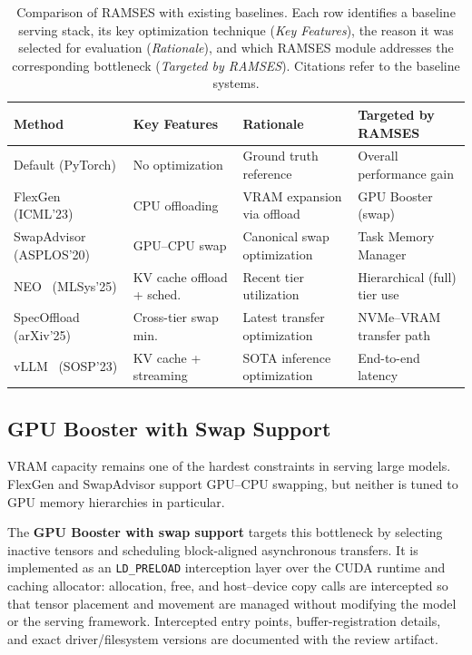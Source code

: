 \begin{table}[t]
\centering
\renewcommand{\arraystretch}{1.0}
\caption{Comparison of RAMSES with existing baselines. Each row identifies a baseline serving stack, its key optimization technique (\emph{Key Features}), the reason it was selected for evaluation (\emph{Rationale}), and which RAMSES module addresses the corresponding bottleneck (\emph{Targeted by RAMSES}). Citations refer to the baseline systems.}
\label{tab:baseline_comparison}
\begin{tabular}{|p{3.8cm}|p{3cm}|p{3.5cm}|p{3.5cm}|}
\hline
\textbf{Method} & \textbf{Key Features} & \textbf{Rationale} & \textbf{Targeted by RAMSES} \\
\hline
Default (PyTorch) & No optimization & Ground truth reference & Overall performance gain \\
\hline
FlexGen~\cite{sheng2023flexgen} (ICML'23) & CPU offloading & VRAM expansion via offload & GPU Booster (swap) \\
\hline
SwapAdvisor~\cite{swapAdvisor2020} (ASPLOS'20) & GPU--CPU swap & Canonical swap optimization & Task Memory Manager \\
\hline
NEO~\cite{jiang2024neo} (MLSys'25) & KV cache offload + sched. & Recent tier utilization & Hierarchical (full) tier use \\
\hline
SpecOffload~\cite{zhuge2025specoffload} (arXiv'25) & Cross-tier swap min. & Latest transfer optimization & NVMe--VRAM transfer path \\
\hline
vLLM~\cite{kwon2023pagedattention} (SOSP'23) & KV cache + streaming & SOTA inference optimization & End-to-end latency \\
\hline
\end{tabular}
\vspace{-12pt}
\end{table}

\subsection{GPU Booster with Swap Support}
VRAM capacity remains one of the hardest constraints in serving large models. FlexGen \cite{sheng2023flexgen} and SwapAdvisor \cite{swapAdvisor2020} support GPU--CPU swapping, but neither is tuned to GPU memory hierarchies in particular.

The \textbf{GPU Booster with swap support} targets this bottleneck by selecting inactive tensors and scheduling block-aligned asynchronous transfers. It is implemented as an \texttt{LD\_PRELOAD} interception layer over the CUDA runtime and caching allocator: allocation, free, and host--device copy calls are intercepted so that tensor placement and movement are managed without modifying the model or the serving framework. Intercepted entry points, buffer-registration details, and exact driver/filesystem versions are documented with the review artifact.

